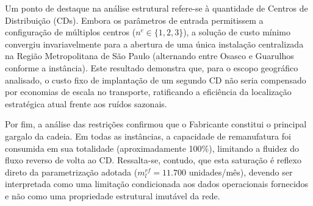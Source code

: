 Um ponto de destaque na análise estrutural refere-se à quantidade de Centros de Distribuição (CDs). Embora os parâmetros de entrada permitissem a configuração de múltiplos centros ($n^{c} \in \{1, 2, 3\}$), a solução de custo mínimo convergiu invariavelmente para a abertura de uma única instalação centralizada na Região Metropolitana de São Paulo (alternando entre Osasco e Guarulhos conforme a instância). Este resultado demonstra que, para o escopo geográfico analisado, o custo fixo de implantação de um segundo CD não seria compensado por economias de escala no transporte, ratificando a eficiência da localização estratégica atual frente aos ruídos sazonais.

Por fim, a análise das restrições confirmou que o Fabricante constitui o principal gargalo da cadeia. Em todas as instâncias, a capacidade de remanufatura foi consumida em sua totalidade (aproximadamente 100\%), limitando a fluidez do fluxo reverso de volta ao CD. Ressalta-se, contudo, que esta saturação é reflexo direto da parametrização adotada ($m_{l}^{rf} = 11.700$ unidades/mês), devendo ser interpretada como uma limitação condicionada aos dados operacionais fornecidos e não como uma propriedade estrutural imutável da rede.

\begin{table}
\centering
\caption{Custos Detalhados e Variações por Instância}
\label{tab:analise_custos_instancias}
\end{table}

